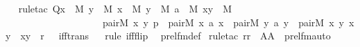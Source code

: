\begin{isabellebody}
%
\isadelimproof
\isanewline
\ \ %
\endisadelimproof
%
\isatagproof
{}\isamarkupfalse%
{\isacharparenleft}{\kern0pt}rule{\isacharunderscore}{\kern0pt}tac\ Q{\isacharequal}{\kern0pt}{\isachardoublequoteopen}{\isacharparenleft}{\kern0pt}{\isasymexists}x\ {\isasymin}\ M{\isachardot}{\kern0pt}\ {\isasymexists}y\ {\isasymin}\ M{\isachardot}{\kern0pt}\ {\isasymexists}x{\isacharprime}{\kern0pt}\ {\isasymin}\ M{\isachardot}{\kern0pt}\ {\isasymexists}y{\isacharprime}{\kern0pt}\ {\isasymin}\ M{\isachardot}{\kern0pt}\ {\isasymexists}a\ {\isasymin}\ M{\isachardot}{\kern0pt}\ {\isasymexists}x{\isacharprime}{\kern0pt}{\isacharunderscore}{\kern0pt}y{\isacharprime}{\kern0pt}\ {\isasymin}\ M{\isachardot}{\kern0pt}\isanewline
\ \ \ \ \ \ \ \ \ \ \ \ \ \ \ \ \ \ \ \ pair{\isacharparenleft}{\kern0pt}{\isacharhash}{\kern0pt}{\isacharhash}{\kern0pt}M{\isacharcomma}{\kern0pt}\ x{\isacharcomma}{\kern0pt}\ y{\isacharcomma}{\kern0pt}\ p{\isacharparenright}{\kern0pt}\ {\isasymand}\ pair{\isacharparenleft}{\kern0pt}{\isacharhash}{\kern0pt}{\isacharhash}{\kern0pt}M{\isacharcomma}{\kern0pt}\ x{\isacharprime}{\kern0pt}{\isacharcomma}{\kern0pt}\ a{\isacharcomma}{\kern0pt}\ x{\isacharparenright}{\kern0pt}\ {\isasymand}\ pair{\isacharparenleft}{\kern0pt}{\isacharhash}{\kern0pt}{\isacharhash}{\kern0pt}M{\isacharcomma}{\kern0pt}\ y{\isacharprime}{\kern0pt}{\isacharcomma}{\kern0pt}\ a{\isacharcomma}{\kern0pt}\ y{\isacharparenright}{\kern0pt}\ {\isasymand}\ pair{\isacharparenleft}{\kern0pt}{\isacharhash}{\kern0pt}{\isacharhash}{\kern0pt}M{\isacharcomma}{\kern0pt}\ x{\isacharprime}{\kern0pt}{\isacharcomma}{\kern0pt}\ y{\isacharprime}{\kern0pt}{\isacharcomma}{\kern0pt}\ x{\isacharprime}{\kern0pt}{\isacharunderscore}{\kern0pt}y{\isacharprime}{\kern0pt}{\isacharparenright}{\kern0pt}\ {\isasymand}\ x{\isacharprime}{\kern0pt}{\isacharunderscore}{\kern0pt}y{\isacharprime}{\kern0pt}\ {\isasymin}\ r{\isacharparenright}{\kern0pt}\ {\isachardoublequoteclose}\ \ iff{\isacharunderscore}{\kern0pt}trans{\isacharparenright}{\kern0pt}\isanewline
\ \ \isamarkupfalse%
{\isacharparenleft}{\kern0pt}rule\ iff{\isacharunderscore}{\kern0pt}flip{\isacharparenright}{\kern0pt}\ \isamarkupfalse%
\ prel{\isacharunderscore}{\kern0pt}fm{\isacharunderscore}{\kern0pt}def\ \isamarkupfalse%
{\isacharparenleft}{\kern0pt}rule{\isacharunderscore}{\kern0pt}tac\ r{\isacharequal}{\kern0pt}r\ \ A{\isacharequal}{\kern0pt}A\ \ prel{\isacharunderscore}{\kern0pt}fm{\isacharunderscore}{\kern0pt}auto{\isacharparenright}{\kern0pt}\ \isamarkupfalse%

\end{isabellebody}
